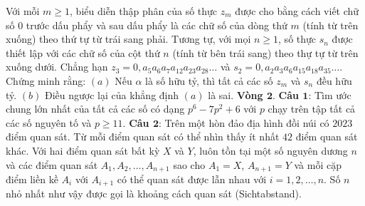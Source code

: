 \begin{multicols}{2}
\begin{figure}[H]
		\vspace*{-5pt}
	\end{figure}
	Với mỗi $m \ge 1$, biểu diễn thập phân của số thực $z_m$ được cho bằng cách viết chữ số $0$ trước dấu phẩy và sau dấu phẩy là các chữ số của dòng thứ $m$ (tính từ trên xuống) theo thứ tự từ trái sang phải. Tương tự, với mọi $n \ge 1$, số thực $s_n$ được thiết lập với các chữ số của cột thứ $n$ (tính từ bên trái sang) theo thự tự từ trên xuống dưới. Chẳng hạn $z_3 = 0, a_5a_6a_7a_{12}a_{23}a_{28}\ldots$ và $s_2 = 0,a_2a_3a_6a_{15}a_{18}a_{35}\ldots$. Chứng minh rằng:
	\vskip 0.1cm
	$(a)$ Nếu $\alpha$ là số hữu tỷ, thì tất cả các số $z_m$ và $s_n$ đều hữu tỷ.
	\vskip 0.1cm
	$(b)$ Điều ngược lại của khẳng định $(a)$ là sai.
	\vskip 0.1cm
	\textbf{\color{cackithi}Vòng $\pmb{2.}$}
	\vskip 0.1cm
	\textbf{\color{cackithi}Câu $\pmb{1}$}: Tìm ước chung lớn nhất của tất cả các số có dạng $p^6 - 7p^2 +6$ với $p$ chạy trên tập tất cả các số nguyên tố và $p \ge 11$.
	\vskip 0.1cm
	\textbf{\color{cackithi}Câu $\pmb{2}$}: Trên một hòn đảo địa hình đồi núi có $2023$ điểm quan sát. Từ mỗi điểm quan sát có thể nhìn thấy ít nhất $42$ điểm quan sát khác. Với hai điểm quan sát bất kỳ $X$ và $Y$, luôn tồn tại một số nguyên dương $n$ và các điểm quan sát $A_1,  A_2, \ldots, A_{n+1}$ sao cho $A_1 = X$, $A_{n+1} = Y$ và mỗi cặp điểm liền kề $A_i$ với $A_{i+1}$ có thể quan sát được lẫn nhau với $i = 1, 2, \ldots, n$. Số $n$ nhỏ nhất như vậy được gọi là khoảng cách quan sát (Sichtabstand). 

\end{multicols}
